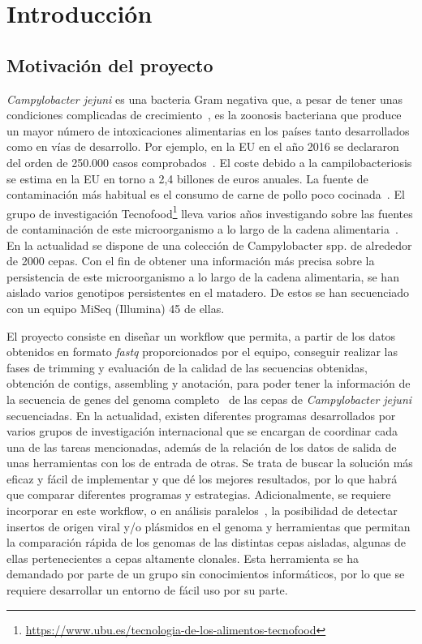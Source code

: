 \chapter{Introducción} 
\label{chap:intro}

\vspace{-0.2cm}

\section{Motivación del proyecto}

\textit{Campylobacter jejuni} es una bacteria Gram negativa que, a pesar de tener unas condiciones complicadas de crecimiento~\cite{garciasanchez2017}, es la zoonosis bacteriana que produce un mayor número de intoxicaciones alimentarias en los países tanto desarrollados como en vías de desarrollo. Por ejemplo, en la EU en el año 2016 se declararon del orden de 250.000 casos comprobados~\cite{report2016}. El coste debido a la campilobacteriosis se estima en la EU en torno a 2,4 billones de euros anuales. La fuente de contaminación más habitual es el consumo de carne de pollo poco cocinada~\cite{GarciaSanchez2018}. El grupo de investigación Tecnofood\footnote{\url{https://www.ubu.es/tecnologia-de-los-alimentos-tecnofood}} lleva varios años investigando sobre las fuentes de contaminación de este microorganismo a lo largo de la cadena alimentaria~\cite{garciasanchez2017, GarciaSanchez2018, Melero2012}. En la actualidad se dispone de una colección de Campylobacter spp. de alrededor de 2000 cepas. Con el fin de obtener una información más precisa sobre la persistencia de este microorganismo a lo largo de la cadena alimentaria, se han aislado varios genotipos persistentes en el matadero. De estos se han secuenciado con un equipo MiSeq (Illumina) 45 de ellas.

El proyecto consiste en diseñar un workflow que permita, a partir de los datos obtenidos en formato \textit{fastq} proporcionados por el equipo, conseguir realizar las fases de trimming y evaluación de la calidad de las secuencias obtenidas, obtención de contigs, assembling y anotación, para poder tener la información de la secuencia de genes del genoma completo~\cite{Clark2016, Llarena2017, Zhao2016} de las cepas de \textit{Campylobacter jejuni} secuenciadas. En la actualidad, existen diferentes programas desarrollados por varios grupos de investigación internacional que se encargan de coordinar cada una de las tareas mencionadas, además de la relación de los datos de salida de unas herramientas con los de entrada de otras. Se trata de buscar la solución más eficaz y fácil de implementar y que dé los mejores resultados, por lo que habrá que comparar diferentes programas y estrategias. Adicionalmente, se requiere incorporar en este workflow, o en análisis paralelos~\cite{Skarp2015}, la posibilidad de detectar insertos de origen viral y/o plásmidos en el genoma y herramientas que permitan la comparación rápida de los genomas de las distintas cepas aisladas, algunas de ellas pertenecientes a cepas altamente clonales. Esta herramienta se ha demandado por parte de un grupo sin conocimientos informáticos, por lo que se requiere desarrollar un entorno de fácil uso por su parte.


